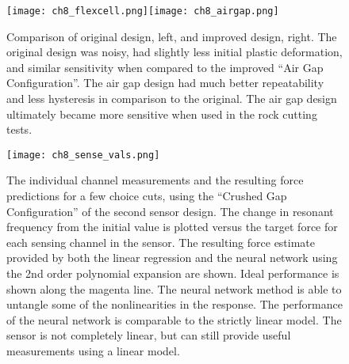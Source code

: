 \begin{figure}[ht]
\centering
\texttt{[image: ch8\_flexcell.png]}\texttt{[image: ch8\_airgap.png]}
\caption{
Comparison of original design, left, and improved design, right.
The original design was noisy, had slightly less initial plastic deformation,
and similar sensitivity when compared to the improved ``Air Gap Configuration''.
The air gap design had much better repeatability and less hysteresis in comparison 
to the original.
The air gap design ultimately became more sensitive when used in the rock cutting tests.
}
\label{fig:xycompare}
\end{figure}



\begin{figure}[h]
\centering
\texttt{[image: ch8\_sense\_vals.png]}
\caption{
The individual channel measurements and the resulting force predictions for a few choice cuts,
using the ``Crushed Gap Configuration'' of the second sensor design.
The change in resonant frequency from the initial value is plotted versus the target force
for each sensing channel in the sensor. The resulting force estimate provided by both the 
linear regression and the neural network using the 2nd order polynomial expansion are shown.
Ideal performance is shown along the magenta line. 
The neural network method is able to untangle some of the nonlinearities in the response.
The performance of the neural network is comparable to the strictly linear model.
The sensor is not completely linear, but can still provide useful measurements using a linear model.
}
\label{fig:sense_chans}
\end{figure}

